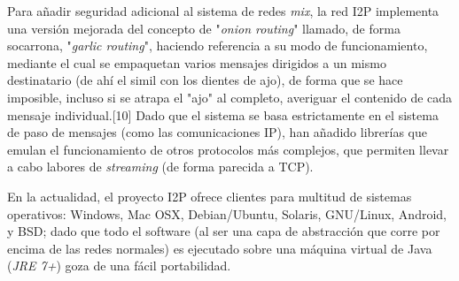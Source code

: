 \documentclass[12]{article}
\begin{document}
Para añadir seguridad adicional al sistema de redes \textit{mix}, la red I2P implementa una versión mejorada del concepto de "\textit{onion routing}" llamado, de forma socarrona, "\textit{garlic routing}",
haciendo referencia a su modo de funcionamiento, mediante el cual se empaquetan varios mensajes dirigidos a un mismo destinatario (de ahí el simil con los dientes de ajo),
de forma que se hace imposible, incluso si se atrapa el "ajo" al completo, averiguar el contenido de cada mensaje individual.[10]
Dado que el sistema se basa estrictamente en el sistema de paso de mensajes (como las comunicaciones IP), han añadido librerías que emulan el funcionamiento de otros protocolos más complejos,
que permiten llevar a cabo labores de \textit{streaming} (de forma parecida a TCP).

En la actualidad, el proyecto I2P ofrece clientes para multitud de sistemas operativos: Windows, Mac OSX, Debian/Ubuntu, Solaris, GNU/Linux, Android, y BSD; dado que todo el software
(al ser una capa de abstracción que corre por encima de las redes normales) es ejecutado sobre una máquina virtual de Java (\textit{JRE 7+}) goza de una fácil portabilidad.
\end{document}
